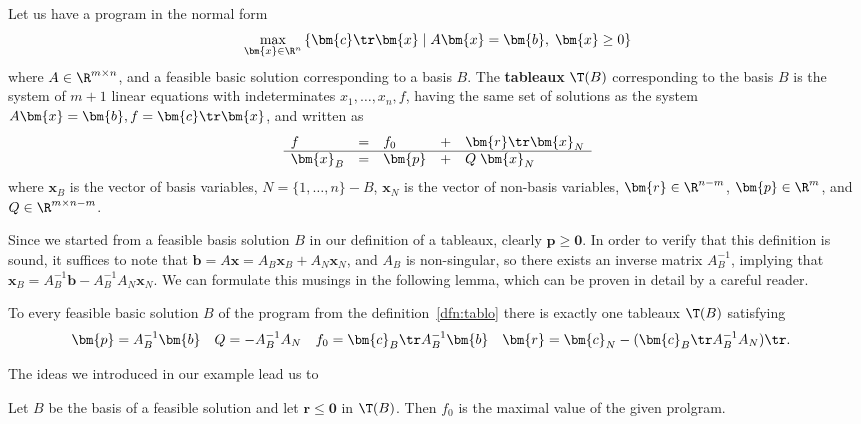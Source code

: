\begin{framed}
  \begin{dfn}
  \label{dfn:tablo}
Let us have a program in the normal form
$$\max_{\bm{x}\in\R^n}\left\{ \bm{c}\tr\bm{x} \mid A\bm{x}=\bm{b},\; \bm{x}\ge0
\right\}$$
where $A\in\R^{m\times n}$, 
and a feasible basic solution corresponding to a basis $B$. The {\bfseries tableaux}
$\T(B)$
corresponding to the basis $B$ is the system of $m+1$ linear equations with indeterminates
$x_1,\ldots,x_n,f$,
having the same set of solutions as the system
$ A\bm{x}=\bm{b}, f= \bm{c}\tr\bm{x}$, and written as
$$
\begin{array}{lllll}
  f & = & f_0 & + & \bm{r}\tr\bm{x}_N\\\hline
  \bm{x}_B & = & \bm{p} & + & Q\;\bm{x}_N
\end{array}
$$
where $\bm{x}_B$ is the vector of basis variables,  $N=\{1,\ldots,n\}-B$, $\bm{x}_N$ is the 
vector of non-basis variables,  $\bm{r}\in\R^{n-m}$, $\bm{p}\in\R^m$, and  $Q\in\R^{m\times n-m}$.
\end{dfn}
\end{framed}

\noindent
Since we started from a feasible basis solution $B$ in our definition of a tableaux, clearly
$\bm{p}\ge\bm{0}$. In order  to verify that this definition is sound, it suffices to note
that $\bm{b}=A\bm{x}=A_B\bm{x}_B+A_N\bm{x}_N$, and $A_B$ is non-singular, so there exists
an inverse matrix $A_B^{-1}$, implying that $\bm{x}_B=A_B^{-1}\bm{b}-A_B^{-1}A_N\bm{x}_N$.
We can formulate this musings in the following lemma, which can be proven in detail by 
a careful reader.

\begin{lema}
  \label{lm:LPtablo}
  To every feasible basic solution $B$ of the program from the definition~\ref{dfn:tablo}
  there is exactly one tableaux $\T(B)$ satisfying
  \begin{align*}
    \bm{p} &= A_B^{-1}\bm{b} &
    Q      &= -A_B^{-1}A_N &
    f_0    &= \bm{c}_B\tr A_B^{-1}\bm{b}&
    \bm{r} &= \bm{c}_N-(\bm{c}_B\tr A_B^{-1} A_N)\tr.
  \end{align*}
\end{lema}

\noindent
The ideas we introduced in our example lead us to

\begin{clm}
  \label{clm:simplexend}
  Let $B$ be the basis of a feasible solution and let $\bm{r}\le\bm{0}$ in $\T(B)$.
  Then $f_0$ is the maximal value of the given prolgram.
\end{clm}

